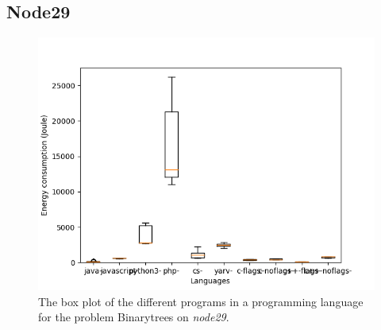 \begin{appendices}

\chapter{Node29}
\label{app:node29}
\begin{figure}[h]
    \centering
    \includegraphics[width=.6\textwidth]{graphs/binarytrees_BOXoverview2.png}
    \caption{The box plot of the different programs in a programming language for the problem Binarytrees on \textit{node29}.}
    \label{fig:box-binarytrees2}
\end{figure}


\end{appendices}

